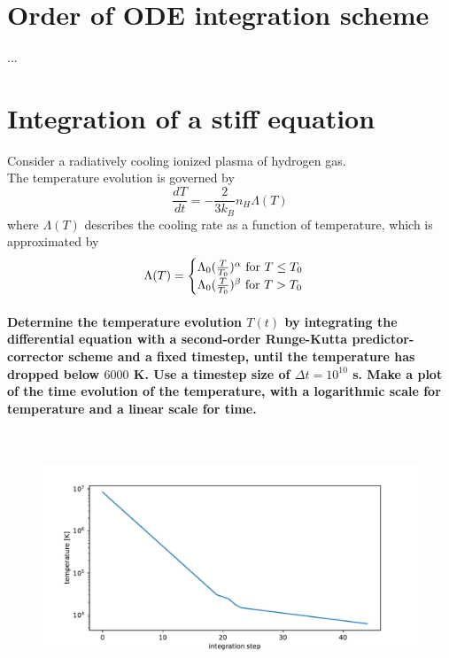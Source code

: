 \documentclass[11 pt]{article}
\begin{document}
    \section{Order of ODE integration scheme}
    ...

    \section{Integration of a stiff equation}
    Consider a radiatively cooling ionized plasma of hydrogen gas. \\
    The temperature evolution is governed by
    \begin{equation}
        \frac{dT}{dt}=-\frac{2}{3k_B}n_H\Lambda(T)    
    \end{equation}
    where $\Lambda(T)$ describes the cooling rate as a function of 
    temperature, which is approximated by 
    \begin{equation}
        \Lambda(T)=
        \begin{cases}
            \Lambda_0(\frac{T}{T_0})^\alpha\textnormal{ for }T\leq T_0 \\
            \Lambda_0(\frac{T}{T_0})^\beta\textnormal{ for }T>T_0
        \end{cases}
    \end{equation}
    \paragraph{Determine the temperature evolution $T(t)$ by integrating 
    the differential equation with a second-order Runge-Kutta 
    predictor-corrector scheme and a fixed timestep, until the 
    temperature has dropped below $6000$ K. Use a timestep size of 
    $\Delta t=10^{10}$ s. Make a plot of the time evolution of the temperature,
    with a logarithmic scale for temperature and a linear scale for time.} \ \\
        \begin{figure}[h!]
            \centering
            \includegraphics[width=0.8\linewidth]{temperatures.pdf}
        \end{figure}
\end{document}
